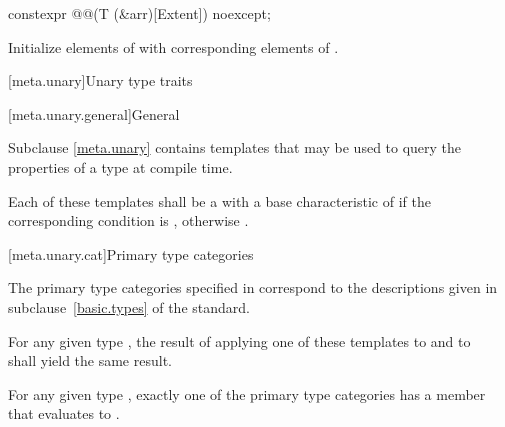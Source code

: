 \begin{itemdecl}
constexpr @@(T (&arr)[Extent]) noexcept;
\end{itemdecl}

\begin{itemdescr}
\pnum
\effects
Initialize elements of  with corresponding elements of .
\end{itemdescr}

[meta.unary]{Unary type traits}

[meta.unary.general]{General}

\pnum
Subclause \ref{meta.unary} contains templates that may be used to query the
properties of a type at compile time.

\pnum
Each of these templates shall be a
with a base characteristic of
 if the corresponding condition is , otherwise
.

[meta.unary.cat]{Primary type categories}

\pnum
The primary type categories specified in 
correspond to the descriptions given in
subclause~\ref{basic.types} of the \Cpp{} standard.

\pnum
For any given type , the result of applying one of these templates to
 and to \cv{}~ shall yield the same result.

\pnum
\begin{note}
For any given type , exactly one of the primary type categories
has a  member that evaluates to .
\end{note}

